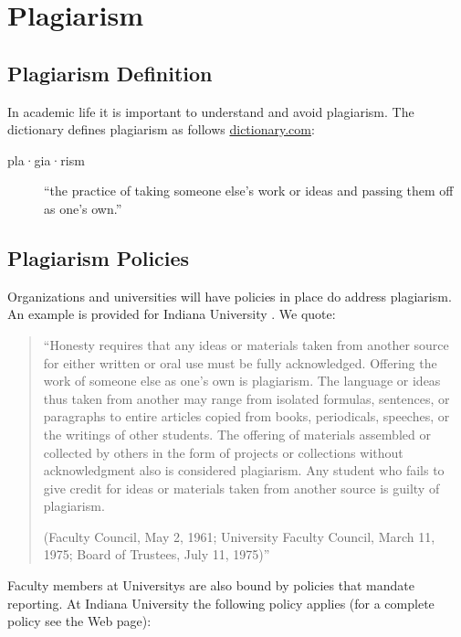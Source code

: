 \FILENAME

\section{Plagiarism}

\subsection{Plagiarism Definition}

In academic life it is important to understand and avoid plagiarism.
The dictionary defines plagiarism as follows \url{dictionary.com}:

\begin{description}
\item[pla·gia·rism] \textipa{['pl\=aj@""riz@m]} ``the practice of taking someone else's work or ideas and passing them
off as one's own.''
\end{description}



\subsection{Plagiarism Policies}
Organizations and universities will have policies in place do address
plagiarism. An example is provided for Indiana University
\cite{www-iu-plagiarism}. We quote:

\begin{quotation}
``Honesty requires that any ideas or materials taken from
another source for either written or oral use must be fully
acknowledged. Offering the work of someone else as one’s own is
plagiarism. The language or ideas thus taken from another may range
from isolated formulas, sentences, or paragraphs to entire articles
copied from books, periodicals, speeches, or the writings of other
students. The offering of materials assembled or collected by others
in the form of projects or collections without acknowledgment also is
considered plagiarism. Any student who fails to give credit for ideas
or materials taken from another source is guilty of plagiarism. 

(Faculty Council, May 2, 1961; University Faculty Council, March 11,
1975; Board of Trustees, July 11, 1975)''
\end{quotation}

Faculty members at Universitys are also bound by policies that mandate
reporting. At Indiana University the following policy applies (for a
complete policy see the Web page):

